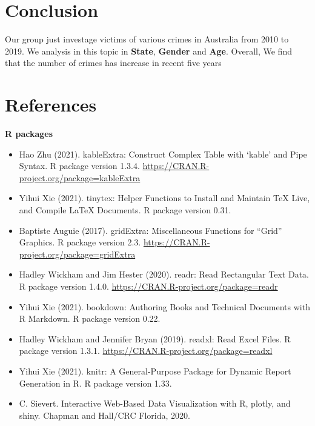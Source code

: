 \documentclass[11pt,a4paper,]{article}
\providecommand{\tightlist}{%
  \setlength{\itemsep}{0pt}\setlength{\parskip}{0pt}}
\begin{document}
\clearpage
\section*{Conclusion}

Our group just investage victims of various crimes in Australia from 2010 to 2019. We analysis in this topic in \textbf{State}, \textbf{Gender} and \textbf{Age}. Overall, We find that the number of crimes has increase in recent five years

\clearpage
\section*{References}

\textbf{R packages}

\begin{itemize}
\tightlist
\item
  Hao Zhu (2021). kableExtra: Construct Complex Table with `kable' and Pipe Syntax. R package version 1.3.4.
  \url{https://CRAN.R-project.org/package=kableExtra}\\
\item
  Yihui Xie (2021). tinytex: Helper Functions to Install and Maintain TeX Live, and Compile LaTeX
  Documents. R package version 0.31.\\
\item
  Baptiste Auguie (2017). gridExtra: Miscellaneous Functions for ``Grid'' Graphics. R package version 2.3.
  \url{https://CRAN.R-project.org/package=gridExtra}\\
\item
  Hadley Wickham and Jim Hester (2020). readr: Read Rectangular Text Data. R package version 1.4.0.
  \url{https://CRAN.R-project.org/package=readr}\\
\item
  Yihui Xie (2021). bookdown: Authoring Books and Technical Documents with R Markdown. R package version
  0.22.\\
\item
  Hadley Wickham and Jennifer Bryan (2019). readxl: Read Excel Files. R package version 1.3.1.
  \url{https://CRAN.R-project.org/package=readxl}\\
\item
  Yihui Xie (2021). knitr: A General-Purpose Package for Dynamic Report Generation in R. R package version
  1.33.\\
\item
  C. Sievert. Interactive Web-Based Data Visualization with R, plotly, and shiny. Chapman and Hall/CRC
  Florida, 2020.
\end{itemize}
\end{document}
